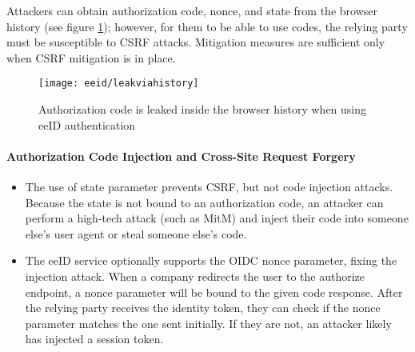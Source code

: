  Attackers can obtain authorization code, nonce, and state from the browser history (see figure \ref{fig:eeid-leakviahistory}); however, for them to be able to use codes, the relying party must be susceptible to CSRF attacks. Mitigation measures are sufficient only when CSRF mitigation is in place.

\begin{figure}
  \centering
  \texttt{[image: eeid/leakviahistory]}
  \caption{Authorization code is leaked inside the browser history when using eeID authentication}
  \label{fig:eeid-leakviahistory}
\end{figure}

\paragraph{Authorization Code Injection and Cross-Site Request Forgery}

\begin{itemize}
  \item The use of state parameter prevents CSRF, but not code injection attacks. Because the state is not bound to an authorization code, an attacker can perform a high-tech attack (such as MitM) and inject their code into someone else's user agent or steal someone else's code.
  \item The eeID service optionally supports the OIDC nonce parameter, fixing the injection attack. When a company redirects the user to the {authorize} endpoint, a nonce parameter will be bound to the given code response. After the relying party receives the identity token, they can check if the nonce parameter matches the one sent initially. If they are not, an attacker likely has injected a session token.
\end{itemize}

